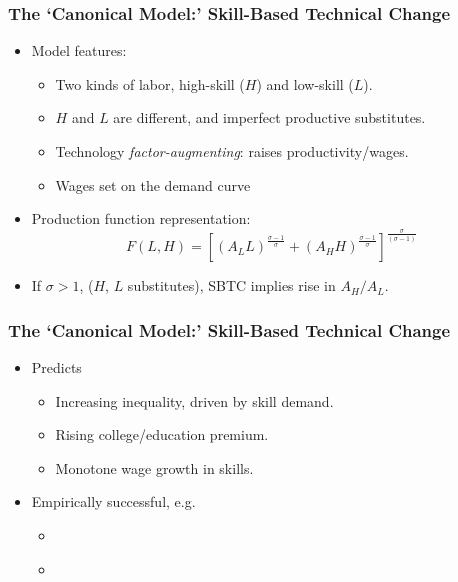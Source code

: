 \documentclass[red]{beamer}
\begin{document}
\begin{frame}
\frametitle{The `Canonical Model:' Skill-Based Technical Change}
\begin{itemize}
\item Model features:
\begin{itemize}
\item Two kinds of labor, high-skill ($H$) and low-skill ($L$).
\item $H$ and $L$ are different, and imperfect productive substitutes.
\item Technology \emph{factor-augmenting}: raises productivity/wages.
\item Wages set on the demand curve
\end{itemize}
\vspace{5mm}
\item Production function representation:
\begin{equation*}
  \label{eq:cobbdoug}
  F(L,H) = \left[\left(A_LL\right)^{\frac{\sigma - 1}{\sigma}}
            + \left(A_HH\right)^{\frac{\sigma - 1}{\sigma}}
          \right]^\frac{\sigma}{(\sigma-1)}
\end{equation*}
\vspace{5mm}
\item If $\sigma>1$, ($H$, $L$ substitutes), SBTC implies rise in $A_H/A_L$.
\end{itemize}
\end{frame}

\begin{frame}
\frametitle{The `Canonical Model:' Skill-Based Technical Change}
\begin{itemize}
\item Predicts
  \begin{itemize}
  \item Increasing inequality, driven by skill demand.
  \item Rising college/education premium.
  \item Monotone wage growth in skills.
  \end{itemize}
\vspace{1cm}
\item Empirically successful, e.g.
  \begin{itemize}
  \item \citet{Katz1992}
  \item \citet{Card2001}
  \end{itemize}
\end{itemize}
\end{frame}
\end{document}
